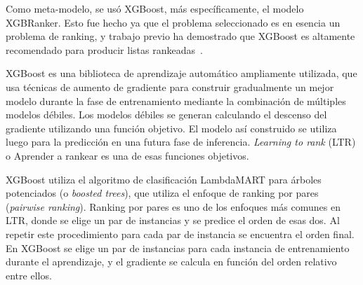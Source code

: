 Como meta-modelo, se usó XGBoost, más específicamente, el modelo XGBRanker. Esto fue hecho ya que el problema seleccionado es en esencia un problema de ranking, y trabajo previo ha demostrado que XGBoost es altamente recomendado para producir listas rankeadas~\cite{rankml}.

XGBoost es una biblioteca de aprendizaje automático ampliamente utilizada, que usa técnicas de aumento de gradiente para construir gradualmente un mejor modelo durante la fase de entrenamiento mediante la combinación de múltiples modelos débiles. Los modelos débiles se generan calculando el descenso del gradiente utilizando una función objetivo. El modelo así construido se utiliza luego para la predicción en una futura fase de inferencia. \textit{Learning to rank} (LTR) o Aprender a rankear es una de esas funciones objetivos.


XGBoost utiliza el algoritmo de clasificación LambdaMART \cite{burges2010from} para árboles potenciados (o \textit{boosted trees}), que utiliza el enfoque de ranking por pares (\textit{pairwise ranking}). Ranking por pares es uno de los enfoques más comunes en LTR, donde se elige un par de instancias y se predice el orden de esas dos. Al repetir este procedimiento para cada par de instancia se encuentra el orden final. En XGBoost se elige un par de instancias para cada instancia de entrenamiento durante el aprendizaje, y el gradiente se calcula en función del orden relativo entre ellos. %

